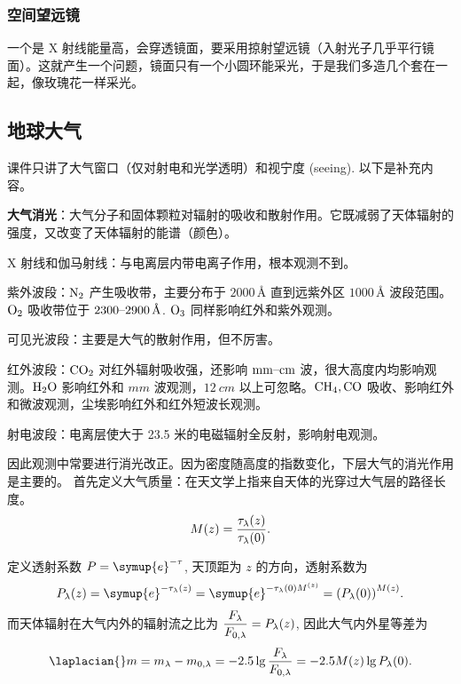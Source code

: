 \documentclass[UTF8, 12pt, a4paper, oneside, onecolumn, fontset=none]{ctexart}
\begin{document}
\subsubsection{空间望远镜}
一个是 X 射线能量高，会穿透镜面，要采用掠射望远镜（入射光子几乎平行镜面）。这就产生一个问题，镜面只有一个小圆环能采光，于是我们多造几个套在一起，像玫瑰花一样采光。

\subsection{地球大气}
课件只讲了大气窗口（仅对射电和光学透明）和视宁度 (seeing). 以下是补充内容。

\textbf{大气消光}：大气分子和固体颗粒对辐射的吸收和散射作用。它既减弱了天体辐射的强度，又改变了天体辐射的能谱（颜色）。

X 射线和伽马射线：与电离层内带电离子作用，根本观测不到。

紫外波段：$\ce{N2}$ 产生吸收带，主要分布于 $2000\,\unit{\angstrom}$ 直到远紫外区 $1000\,\unit{\angstrom}$ 波段范围。$\ce{O2}$ 吸收带位于 $2300\text{\textendash}2900\,\unit{\angstrom}$. $\ce{O3}$ 同样影响红外和紫外观测。

可见光波段：主要是大气的散射作用，但不厉害。

红外波段：$\ce{CO2}$ 对红外辐射吸收强，还影响 $\unit{mm}\text{\textendash}\unit{cm}$ 波，很大高度内均影响观测。$\ce{H2O}$ 影响红外和 $\unit{mm}$ 波观测，$\qty{12}{cm}$ 以上可忽略。$\ce{CH4, CO}$ 吸收、影响红外和微波观测，尘埃影响红外和红外短波长观测。

射电波段：电离层使大于 23.5 米的电磁辐射全反射，影响射电观测。

因此观测中常要进行消光改正。因为密度随高度的指数变化，下层大气的消光作用是主要的。
首先定义大气质量：在天文学上指来自天体的光穿过大气层的路径长度。
\begin{equation}
M\mleft(z\mright)=\frac{\tau_{\lambda}\mleft(z\mright)}{\tau_{\lambda}\mleft(0\mright)}.
\end{equation}

定义透射系数 $P=\symup{e}^{-\tau}$, 天顶距为 $z$ 的方向，透射系数为
\begin{equation}
P_{\lambda}\mleft(z\mright)=\symup{e}^{-\tau_{\lambda}\mleft(z\mright)}=\symup{e}^{-\tau_{\lambda}\mleft(0\mright) M^{\mleft(z\mright)}}=\mleft(P_{\lambda}\mleft(0\mright)\mright)^{M\mleft(z\mright)}.
\end{equation}
而天体辐射在大气内外的辐射流之比为 $\dfrac{F_{\lambda}}{F_{0,\lambda}}=P_{\lambda}\mleft(z\mright)$, 因此大气内外星等差为
\begin{equation}
\laplacian{}m=m_{\lambda}-m_{0,\lambda}=-2.5\lg\frac{F_{\lambda}}{F_{0,\lambda}}=-2.5M\mleft(z\mright)\lg P_{\lambda}\mleft(0\mright).
\end{equation}
\end{document}

